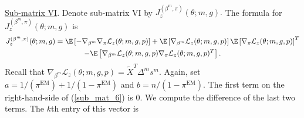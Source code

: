 \documentclass[12pt]{article}
\begin{document}
\\
\noindent
\underline{Sub-matrix VI}. Denote sub-matrix VI by $J_z^{(\beta^m,\pi)}(\theta; m, g).$ The formula for $J_z^{(\beta^m,\pi)}(\theta; m, g)$ is
\begin{multline}\label{sub_mat_6}
J_z^{(\beta^m,\pi)}(\theta; m, g) = \E \left[ - \nabla_{\beta^m} \nabla_{ \pi } \mathcal{L}_z(\theta; m, g, p) \right] + \E\left[ \nabla_{\beta^m}\mathcal{L}_z(\theta ; m,g,p) \right] \E \left[ \nabla_{\pi}\mathcal{L}_z(\theta ; m,g,p) \right]^T \\ - \E \left[ \nabla_{\beta^m}\mathcal{L}_z(\theta; m,g,p) \nabla_{\pi}\mathcal{L}_z(\theta; m,g,p)^T \right].
\end{multline} Recall that $ \nabla_{\beta^m} \mathcal{L}_z(\theta; m, g, p) = \tilde{X}^T \Delta^m s^m$. Again, set $a = 1/(\pi^\textrm{EM}) + 1/(1 - \pi^\textrm{EM})$ and $b = n/(1 - \pi^\textrm{EM}).$ The first term on the right-hand-side of (\ref{sub_mat_6}) is $0$. We compute the difference of the last two terms. The $k$th entry of this vector is
\end{document}

